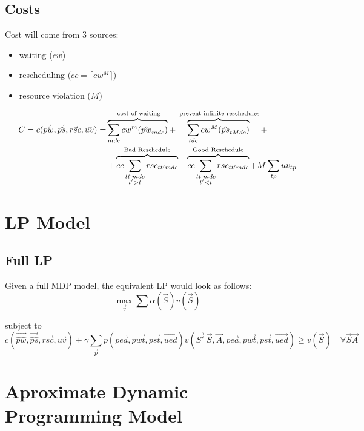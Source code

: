 \documentclass{article}
\begin{document}
\subsection{Costs}
Cost will come from 3 sources:  
\begin{itemize} 
	\item waiting ($cw$)
	\item rescheduling ($cc = \lceil cw^M \rceil$)
	\item resource violation ($M$)
\end{itemize}

\begin{equation}\begin{alignedat}{10}
	& C = c(\vec{\hat{pw}}, \vec{\hat{ps}}, \vec{rsc}, \vec{uv}) = 
		&& 
			\overbrace{ \sum_{mdc} cw^{m} (\hat{pw}_{mdc}) }^\text{
				cost of waiting}  + 
			\overbrace{ \sum_{tdc} cw^{M} (\hat{ps}_{tMdc})}^\text{
				prevent infinite reschedules} + \\
	&	&&  +
			\overbrace{
				cc \sum_{
				\substack{tt`mdc \\ t' > t}} 
				rsc_{tt'mdc}}^\text{Bad Reschedule} - 
			\overbrace{ 
				cc \sum_{
				\substack{tt`mdc \\ t' < t}}
				rsc_{tt'mdc}}^\text{Good Reschedule} + 
			M \sum_{tp} uv_{tp}
\end{alignedat}\end{equation}

\section{LP Model}

\subsection{Full LP} 
Given a full MDP model, the equivalent LP would look as follows:
\begin{equation}
	\max_{\vec{v}} \sum \alpha (\vec{S}) v(\vec{S}) 
\end{equation}

subject to
\begin{equation}
	c(\vec{\hat{pw}}, \vec{\hat{ps}}, \vec{rsc}, \vec{uv}) + \gamma \sum_{\vec{p}} p(\vec{pea}, \vec{pwt}, \vec{pst}, \vec{ued}) v( \vec{S'} | \vec{S}, \vec{A}, \vec{pea}, \vec{pwt}, \vec{pst}, \vec{ued}) \ge v(\vec{S}) \quad \forall \vec{S} \vec{A}
\end{equation}

\section{Aproximate Dynamic Programming Model}
\end{document}
